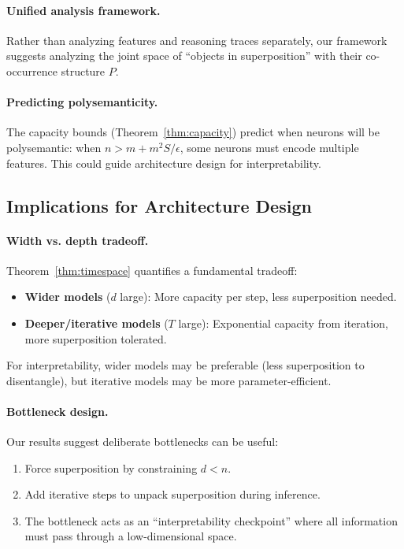 \paragraph{Unified analysis framework.} Rather than analyzing features and reasoning traces separately, our framework suggests analyzing the joint space of ``objects in superposition'' with their co-occurrence structure $P$.

\paragraph{Predicting polysemanticity.} The capacity bounds (Theorem~\ref{thm:capacity}) predict when neurons will be polysemantic: when $n > m + m^2 S / \epsilon$, some neurons must encode multiple features. This could guide architecture design for interpretability.

\subsection{Implications for Architecture Design}

\paragraph{Width vs. depth tradeoff.} Theorem~\ref{thm:timespace} quantifies a fundamental tradeoff:
\begin{itemize}
    \item \textbf{Wider models} ($d$ large): More capacity per step, less superposition needed.
    \item \textbf{Deeper/iterative models} ($T$ large): Exponential capacity from iteration, more superposition tolerated.
\end{itemize}
For interpretability, wider models may be preferable (less superposition to disentangle), but iterative models may be more parameter-efficient.

\paragraph{Bottleneck design.} Our results suggest deliberate bottlenecks can be useful:
\begin{enumerate}
    \item Force superposition by constraining $d < n$.
    \item Add iterative steps to unpack superposition during inference.
    \item The bottleneck acts as an ``interpretability checkpoint'' where all information must pass through a low-dimensional space.
\end{enumerate}

